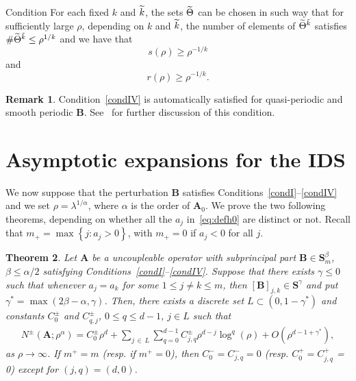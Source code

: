 \documentclass[10pt]{amsart}
\newtheorem{theo}{Theorem}[section]
\theoremstyle{definition}\newtheorem{defi}[theo]{Definition}\newtheorem{rema}[theo]{Remark}\newtheorem{exam}[theo]{Example}\newtheorem{nota}[theo]{Notation}
\newcommand{\BA}{\mathbf A}
\newcommand{\BB}{\mathbf B}
\newcommand{\BS}{\mathbf S}
\newcommand{\pd}{uncoupleable}
\newcommand{\bigo}[1]{O\left(#1 \right)}
\newcommand{\set}[1]{\left\{ #1 \right\}}
\let\oldtilde\tilde
\renewcommand*{\tilde}[1]{\mathchoice{\widetilde{#1}}{\widetilde{#1}}{\oldtilde{#1}}{\oldtilde{#1}}}
\begin{document}
\begin{enonce}{Condition}\label{condIV}
For each fixed $k$ and $\tilde k$, the sets $\tilde \Theta$ can be chosen in such way that for sufficiently large $\rho$, depending on $k$ and $\tilde k$, the number of elements of $\tilde \Theta^{\tilde k}$ satisfies $\#\tilde \Theta^{\tilde k} \le \rho^{1/k}$ and we have that
\begin{equation}\label{eq:boundons}
s(\rho) \ge \rho^{-1/k}
\end{equation}
and
\begin{equation}\label{eq:boundonr}
r(\rho) \ge \rho^{-1/k}.
\end{equation}
\end{enonce}

\begin{rema}
Condition~\ref{condIV} is automatically satisfied for quasi-periodic and smooth periodic $\BB$. See~\cite{ParSht2012} for further discussion of this condition.
\end{rema}


\section{Asymptotic expansions for the IDS} \label{sec:asyexp}
We now suppose that the perturbation $\BB$ satisfies Conditions~\ref{condI}--\ref{condIV} and we set $\rho = \lambda^{1/\alpha}$, where $\alpha$ is the order of $\BA_0$. We prove the two following theorems, depending on whether all the $a_j$ in~\eqref{eq:defh0} are distinct or not. Recall that $m_+ = \max \set{j : a_j > 0}$, with $m_+ = 0$ if $a_j < 0$ for all $j$.
\begin{theo} \label{thm:aexpconcretecut}
Let $\BA$ be a \pd{} operator with subprincipal part $\BB \in \BS^{\beta}_m$, $\beta \le \alpha/2$ satisfying Conditions~\ref{condI}--\ref{condIV}. Suppose that there exists $\gamma \le 0$ such that whenever $a_j = a_k$ for some $1 \le j \ne k \le m$, then $[\BB]_{j,k} \in \BS^{\gamma}$ and put $\gamma^* = \max(2 \beta - \alpha, \gamma)$. Then, there exists a discrete set $L \subset (0,1 - \gamma^*)$ and constants $C_0^\pm$ and $C_{q,j}^\pm$, $0 \le q \le d-1$, $j \in L$ such that
\begin{equation}\label{eq:asymptoticsconcretecut}
\begin{aligned}
N^\pm\left(\BA; \rho^\alpha \right) = C_0^\pm \rho^d + \sum_{j\,\in\,L}\sum_{q =0}^{d-1} C_{j,q}^\pm \rho^{d-j} \log^q(\rho) + \bigo{\rho^{d - 1 + \gamma^*}},
\end{aligned}
\end{equation}
as $\rho \to \infty$. If $m^+ = m$ (resp. if $m^+ = 0$), then $C_0^- = C^-_{j,q} = 0$ (resp. $C_0^+ = C^+_{j,q}$ = 0) except for $(j,q) = (d,0)$.
\end{theo}
\end{document}
